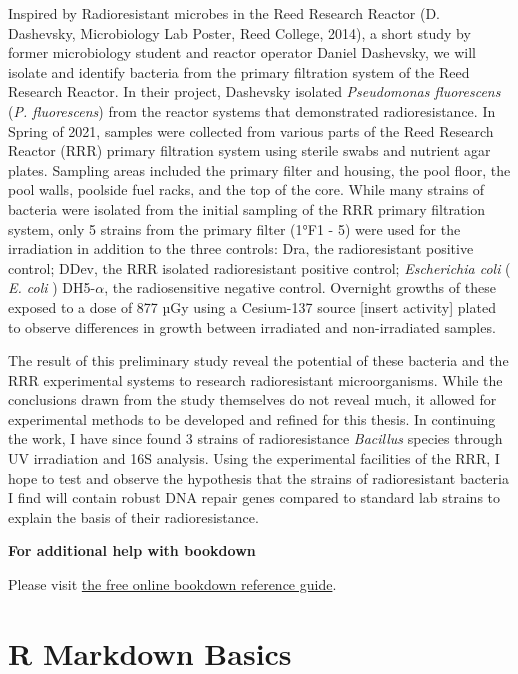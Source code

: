 \documentclass[12pt,twoside]{reedthesis}
\begin{document}
Inspired by Radioresistant microbes in the Reed Research Reactor (D. Dashevsky, Microbiology Lab Poster, Reed College, 2014), a short study by former microbiology student and reactor operator Daniel Dashevsky, we will isolate and identify bacteria from the primary filtration system of the Reed Research Reactor. In their project, Dashevsky isolated \emph{Pseudomonas fluorescens} (\emph{P. fluorescens}) from the reactor systems that demonstrated radioresistance. In Spring of 2021, samples were collected from various parts of the Reed Research Reactor (RRR) primary filtration system using sterile swabs and nutrient agar plates. Sampling areas included the primary filter and housing, the pool floor, the pool walls, poolside fuel racks, and the top of the core. While many strains of bacteria were isolated from the initial sampling of the RRR primary filtration system, only 5 strains from the primary filter (1°F1 - 5) were used for the irradiation in addition to the three controls: Dra, the radioresistant positive control; DDev, the RRR isolated radioresistant positive control; \emph{Escherichia coli} ( \emph{E. coli} ) DH5-\(\alpha\), the radiosensitive negative control. Overnight growths of these exposed to a dose of 877 µGy using a Cesium-137 source {[}insert activity{]} plated to observe differences in growth between irradiated and non-irradiated samples.

The result of this preliminary study reveal the potential of these bacteria and the RRR experimental systems to research radioresistant microorganisms. While the conclusions drawn from the study themselves do not reveal much, it allowed for experimental methods to be developed and refined for this thesis. In continuing the work, I have since found 3 strains of radioresistance \emph{Bacillus} species through UV irradiation and 16S analysis. Using the experimental facilities of the RRR, I hope to test and observe the hypothesis that the strains of radioresistant bacteria I find will contain robust DNA repair genes compared to standard lab strains to explain the basis of their radioresistance.

\textbf{For additional help with bookdown}

Please visit \href{https://bookdown.org/yihui/bookdown/}{the free online bookdown reference guide}.

\hypertarget{rmd-basics}{%
\chapter{R Markdown Basics}\label{rmd-basics}}
\end{document}

